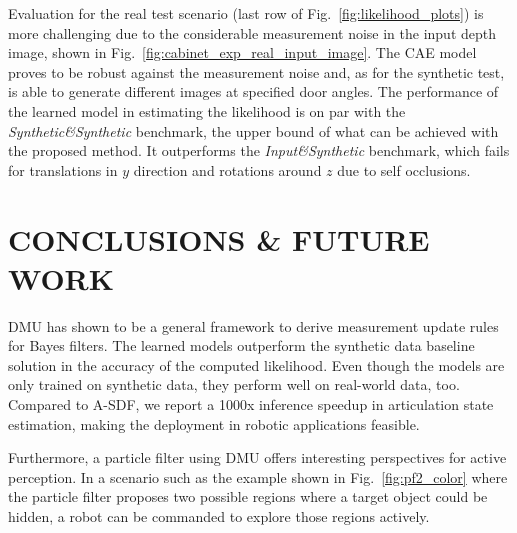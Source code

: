 \documentclass[letterpaper, 10 pt, journal, twoside]{ieeetran}  %
\begin{document}
Evaluation for the real test scenario (last row of Fig.~\ref{fig:likelihood_plots}) is more challenging due to the considerable measurement noise in the input depth image, shown in Fig.~\ref{fig:cabinet_exp_real_input_image}.
The CAE model proves to be robust against the measurement noise and, as for the synthetic test, is able to generate different images at specified door angles.
The performance of the learned model in estimating the likelihood is on par with the \textit{Synthetic\&Synthetic} benchmark, the upper bound of what can be achieved with the proposed method. It outperforms the \textit{Input\&Synthetic} benchmark, which fails for translations in $y$ direction and rotations around $z$ due to self occlusions.
\section{CONCLUSIONS \& FUTURE WORK}
\label{sec:conclusions}
DMU has shown to be a general framework to derive measurement update rules for Bayes filters. The learned models outperform the synthetic data baseline solution in the accuracy of the computed likelihood. Even though the models are only trained on synthetic data, they perform well on real-world data, too.
Compared to A-SDF, we report a 1000x inference speedup in articulation state estimation, making the deployment in robotic applications feasible.

Furthermore, a particle filter using DMU offers interesting perspectives for active perception. In a scenario such as the example shown in Fig.~\ref{fig:pf2_color} where the particle filter proposes two possible regions where a target object could be hidden, a robot can be commanded to explore those regions actively.
\end{document}
